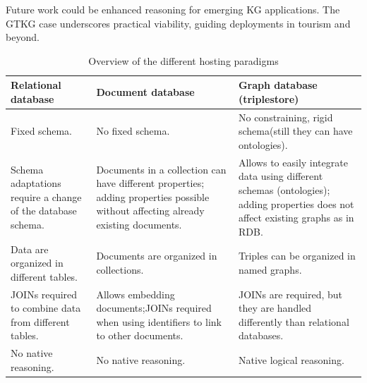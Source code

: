 \documentclass[12pt]{article}
\begin{document}
Future work could be enhanced reasoning for emerging KG applications. The GTKG case underscores practical viability, guiding deployments in tourism and beyond.


\begin{table}[htbp]  %
    \centering
    \caption{Overview of the different hosting paradigms}  %
    \label{tab:overview}  %
    \begin{tabularx}{\textwidth}{|X|X|X|}  %
        \hline  %
        Relational database                                         & Document database                                                                                                                 & Graph database (triplestore)                                                                                                       \\  %
        \hline
        Fixed schema.                                               & No fixed schema.                                                                                                                  & No constraining, rigid schema(still they can have ontologies).                                                                     \\
        \hline
        Schema adaptations require a change of the database schema. & Documents in a collection can have different properties; adding properties possible without affecting already existing documents. & Allows to easily integrate data using different schemas (ontologies); adding properties does not affect existing graphs as in RDB. \\
        \hline
        Data are organized in different tables.                     & Documents are organized in collections.                                                                                           & Triples can be organized in named graphs.                                                                                          \\
        \hline
        JOINs required to combine data from different tables.       & Allows embedding documents;JOINs required when using identifiers to link to other documents.                                      & JOINs are required, but they are handled differently than relational databases.                                                    \\
        \hline  %
        No native reasoning.                                        & No native reasoning.                                                                                                              & Native logical reasoning.                                                                                                          \\
        \hline
    \end{tabularx}
\end{table}
\end{document}

